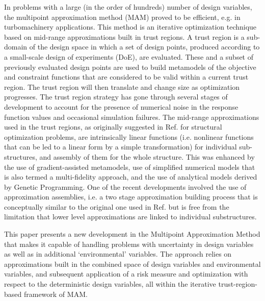 \documentclass[10pt,twocolumn,a4paper]{article}
\begin{document}
In problems with a large (in the order of hundreds) number of design variables, the multipoint approximation method (MAM\cite{Toropov1989,Toropov1992,ToropovFilatov1993}) proved to be efficient, e.g. in turbomachinery applications\cite{ShahparPolynkinToropov2008,PolynkinToropovShahpar2008,PolynkinToropovShahpar2010}. This method is an iterative optimization technique based on mid-range approximations built in trust regions. A trust region is a sub-domain of the design space in which a set of design points, produced according to a small-scale design of experiments (DoE), are evaluated. These and a subset of previously evaluated design points are used to build metamodels of the objective and constraint functions that are considered to be valid within a current trust region. The trust region will then translate and change size as optimization progresses. The trust region strategy has gone through several stages of development to account for the presence of numerical noise in the response function values\cite{KeulenToropovMarkine1996,ToropovKeulenMarkine1996} and occasional simulation failures\cite{ToropovMarkineHolden1999}. The mid-range approximations used in the trust regions, as originally suggested in Ref. \cite{Toropov1989} for structural optimization problems, are intrinsically linear functions (i.e. nonlinear functions that can be led to a linear form by a simple transformation) for individual sub-structures, and assembly of them for the whole structure. This was enhanced by the use of gradient-assisted metamodels,\cite{ToropovFilatov1993} use of simplified numerical models that is also termed a multi-fidelity approach,\cite{ToropovMarkine1996} and the use of analytical models derived by Genetic Programming\cite{ToropovAlvarez1998}. One of the recent developments\cite{PolynkinToropov2012} involved the use of approximation assemblies, i.e. a two stage approximation building process that is conceptually similar to the original one used in Ref. \cite{Toropov1989} but is free from the limitation that lower level approximations are linked to individual substructures.

This paper presents a new development in the Multipoint Approximation Method that makes it capable of handling problems with uncertainty in design variables as well as in additional ‘environmental’ variables. The approach relies on approximations built in the combined space of design variables and environmental variables, and subsequent application of a risk measure and optimization with respect to the deterministic design variables, all within the iterative trust-region-based framework of MAM.
\end{document}
